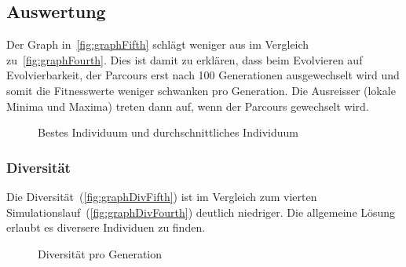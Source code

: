     \subsection{Auswertung\label{sub:fifthAuswertung}}

      Der Graph in~\vref{fig:graphFifth} schlägt weniger aus im Vergleich zu~\vref{fig:graphFourth}.
      Dies ist damit zu erklären, dass beim Evolvieren auf Evolvierbarkeit,
      der Parcours erst nach 100 Generationen ausgewechselt wird und
      somit die Fitnesswerte weniger schwanken pro Generation.
      Die Ausreisser (lokale Minima und Maxima) treten dann auf, wenn der Parcours gewechselt wird.

      \begin{figure}[H]
        \centering
        
        \caption{Bestes Individuum und durchschnittliches Individuum\label{fig:graphFifth}}
      \end{figure}

      \subsubsection{Diversität}

        Die Diversität~(\vref{fig:graphDivFifth}) ist im Vergleich zum
        vierten Simulationslauf~(\vref{fig:graphDivFourth}) deutlich niedriger.
        Die allgemeine Lösung erlaubt es diversere Individuen zu finden.

        \begin{figure}[H]
          \centering
          
          \caption{Diversität pro Generation\label{fig:graphDivFifth}}
        \end{figure}
